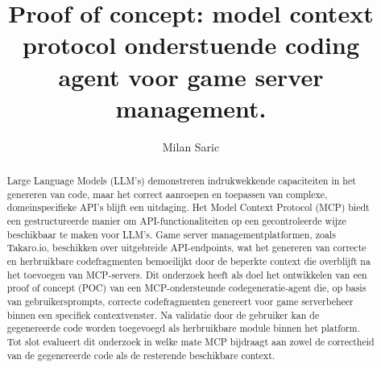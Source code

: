\documentclass{hogent-article}
\title{Proof of concept: model context protocol onderstuende coding agent voor game server management.}
\author{Milan Saric}
\begin{document}
\begin{abstract}
Large Language Models (LLM’s) demonstreren indrukwekkende capaciteiten in het genereren van code, maar het correct aanroepen en toepassen van complexe, domeinspecifieke API’s blijft een uitdaging. Het Model Context Protocol (MCP) biedt een gestructureerde manier om API-functionaliteiten op een gecontroleerde wijze beschikbaar te maken voor LLM’s. Game server managementplatformen, zoals Takaro.io, beschikken over uitgebreide API-endpoints, wat het genereren van correcte en herbruikbare codefragmenten bemoeilijkt door de beperkte context die overblijft na het toevoegen van MCP-servers. Dit onderzoek heeft als doel het ontwikkelen van een proof of concept (POC) van een MCP-ondersteunde codegeneratie-agent die, op basis van gebruikersprompts, correcte codefragmenten genereert voor game serverbeheer binnen een specifiek contextvenster. Na validatie door de gebruiker kan de gegenereerde code worden toegevoegd als herbruikbare module binnen het platform. Tot slot evalueert dit onderzoek in welke mate MCP bijdraagt aan zowel de correctheid van de gegenereerde code als de resterende beschikbare context.
\end{abstract}

\tableofcontents



\printbibliography[heading=bibintoc]
\end{document}
